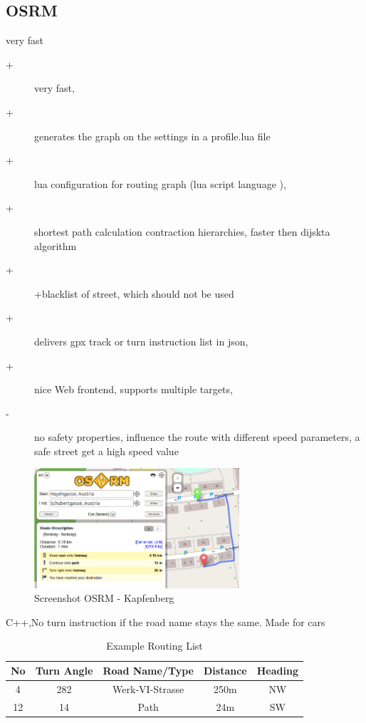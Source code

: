 \documentclass{sig-alternate}
\begin{document}



\subsection{OSRM}
very fast\cite{luxen-vetter-2011}
\begin{description}
\item[+]very fast, 
\item[+]generates the graph on the settings in a profile.lua file
\item[+]lua configuration for routing graph (lua script language ), 
\item[+]shortest path calculation contraction hierarchies, faster then dijskta algorithm
\item[+]+blacklist of street, which should not be used
\item[+]delivers gpx track or turn instruction list in json,
\item[+]nice Web frontend, supports multiple targets,
\item[-] no safety properties, influence the route with different speed parameters, a safe street get a high speed value
\end{description}

\begin{figure}
\centering
\includegraphics[width=3in]{osrm-ss.png}
\caption{Screenshot OSRM - Kapfenberg}
\end{figure}

C++,No turn instruction if the road name stays the same. Made for cars


\begin{table}
\centering
\caption{Example Routing List}
\begin{tabular}{|c|c|c|c|c|} \hline
No&Turn Angle&Road Name/Type&Distance&Heading\\ \hline
4&282&Werk-VI-Strasse&250m&NW\\ \hline
12&14&Path&24m&SW\\ \hline
\end{tabular}
\end{table}
\end{document}
